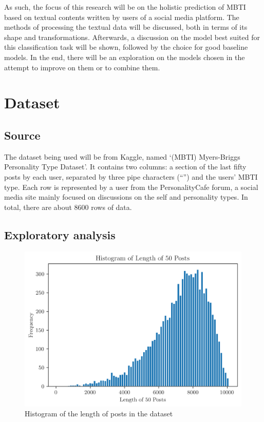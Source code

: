\documentclass[11pt,a4paper]{article}
\begin{document}
	As such, the focus of this research will be on the holistic prediction of MBTI based on textual contents written by users of a social media platform. The methods of processing the textual data will be discussed, both in terms of its shape and transformations. Afterwards, a discussion on the model best suited for this classification task will be shown, followed by the choice for good baseline models. In the end, there will be an exploration on the models chosen in the attempt to improve on them or to combine them.
	
	\section{Dataset}
	
	\subsection{Source}

	The dataset being used will be from Kaggle, named `(MBTI) Myers-Briggs Personality Type Dataset'.\autocite{MBTIMyersBriggsPersonality} It contains two columns: a section of the last fifty posts by each user, separated by three pipe characters (“\textbar\textbar\textbar”) and the users' MBTI type. Each row is represented by a user from the PersonalityCafe forum, a social media site mainly focused on discussions on the self and personality types. In total, there are about 8600 rows of data.
	
	\subsection{Exploratory analysis}
	
	\begin{figure}[h!]
		\centering
		
		\includegraphics[height=8cm]{../output/visualisations/histogram_len_post}
		
		\caption{Histogram of the length of posts in the dataset}
		
	\end{figure}
	
\end{document}

